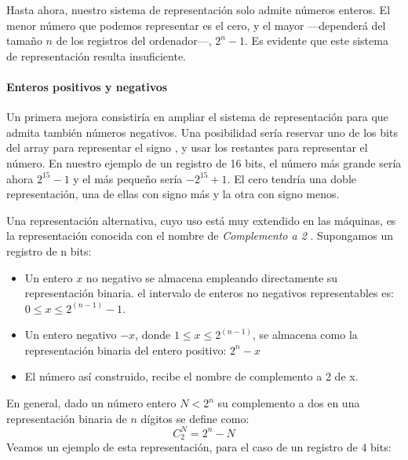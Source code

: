  Hasta ahora, nuestro sistema de representación solo admite números enteros. El menor número que podemos representar es el cero, y el mayor ---dependerá del tamaño $n$ de los registros del ordenador---, $2^n-1$.  Es evidente que este sistema de representación resulta insuficiente.
 
 \paragraph{Enteros positivos y negativos}
 Un primera mejora consistiría en ampliar el sistema de representación para que admita también números negativos. Una posibilidad sería reservar uno de los bits del array para representar el signo , y usar los restantes para representar el número. En nuestro ejemplo de un registro de 16 bits, el número más grande sería ahora $2^{15}-1$ y el más pequeño sería $-2^{15}+1$. El cero tendría una doble representación, una de ellas con signo más y la otra con signo menos.
 
 Una representación alternativa, cuyo uso está muy extendido en las máquinas, es la representación conocida con el nombre de \emph{Complemento a 2}  . Supongamos un registro de n bits:
 \begin{itemize}
 \item Un entero $x$ no negativo se almacena empleando directamente su representación binaria. el intervalo de enteros no negativos representables es: $0 \le x \le 2^{(n-1)}-1$.
 \item Un entero negativo $-x$, donde $1 \le x \le 2^{(n-1)}$, se almacena como la representación binaria del entero positivo: $2^{n}-x$
 \item El número así construido,  recibe el nombre de complemento a 2 de x.
 \end{itemize}
 En general, dado un número entero $N<2^n$ su complemento a dos en una representación binaria de $n$ dígitos se define como:
 \begin{equation*}
 C_2^N=2^n-N
 \end{equation*} 
 Veamos un ejemplo de esta representación, para el caso de un registro de 4 bits:
 
